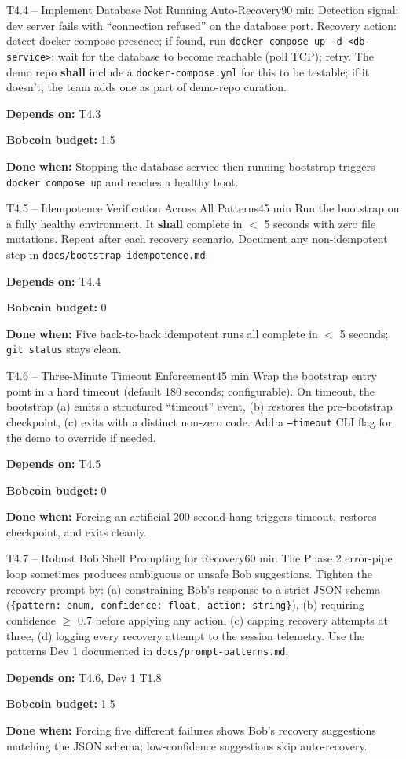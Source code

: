 \documentclass[11pt,letterpaper]{article}
\newcommand{\acceptance}[1]{\par\smallskip\textcolor{ibmgreen}{\textbf{Done when:}} #1}
\newcommand{\depends}[1]{\par\smallskip\textcolor{ibmorange}{\textbf{Depends on:}} #1}
\newcommand{\bobcost}[1]{\par\smallskip\textcolor{ibmaccent}{\textbf{Bobcoin budget:}} #1}
\newcommand{\shall}{\textbf{shall}}
\begin{document}
\begin{task}{T4.4 -- Implement Database Not Running Auto-Recovery}{90 min}
Detection signal: dev server fails with ``connection refused'' on the database port. Recovery action: detect docker-compose presence; if found, run \texttt{docker compose up -d <db-service>}; wait for the database to become reachable (poll TCP); retry. The demo repo \shall{} include a \texttt{docker-compose.yml} for this to be testable; if it doesn't, the team adds one as part of demo-repo curation.
\depends{T4.3}
\bobcost{1.5}
\acceptance{Stopping the database service then running bootstrap triggers \texttt{docker compose up} and reaches a healthy boot.}
\end{task}

\begin{task}{T4.5 -- Idempotence Verification Across All Patterns}{45 min}
Run the bootstrap on a fully healthy environment. It \shall{} complete in $<$ 5 seconds with zero file mutations. Repeat after each recovery scenario. Document any non-idempotent step in \texttt{docs/bootstrap-idempotence.md}.
\depends{T4.4}
\bobcost{0}
\acceptance{Five back-to-back idempotent runs all complete in $<$ 5 seconds; \texttt{git status} stays clean.}
\end{task}

\begin{task}{T4.6 -- Three-Minute Timeout Enforcement}{45 min}
Wrap the bootstrap entry point in a hard timeout (default 180 seconds; configurable). On timeout, the bootstrap (a) emits a structured ``timeout'' event, (b) restores the pre-bootstrap checkpoint, (c) exits with a distinct non-zero code. Add a \texttt{--timeout} CLI flag for the demo to override if needed.
\depends{T4.5}
\bobcost{0}
\acceptance{Forcing an artificial 200-second hang triggers timeout, restores checkpoint, and exits cleanly.}
\end{task}

\begin{task}{T4.7 -- Robust Bob Shell Prompting for Recovery}{60 min}
The Phase 2 error-pipe loop sometimes produces ambiguous or unsafe Bob suggestions. Tighten the recovery prompt by: (a) constraining Bob's response to a strict JSON schema (\texttt{\{pattern: enum, confidence: float, action: string\}}), (b) requiring confidence $\geq$ 0.7 before applying any action, (c) capping recovery attempts at three, (d) logging every recovery attempt to the session telemetry. Use the patterns Dev 1 documented in \texttt{docs/prompt-patterns.md}.
\depends{T4.6, Dev 1 T1.8}
\bobcost{1.5}
\acceptance{Forcing five different failures shows Bob's recovery suggestions matching the JSON schema; low-confidence suggestions skip auto-recovery.}
\end{task}
\end{document}
